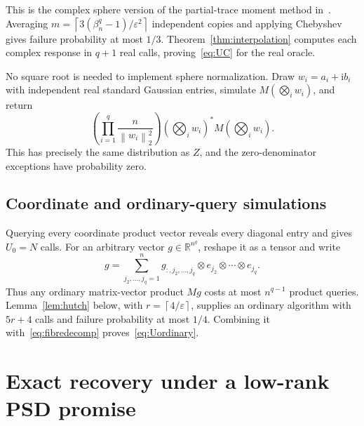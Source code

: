 \documentclass[11pt]{article}
\theoremstyle{definition}\newtheorem{definition}[theorem]{Definition}
\theoremstyle{remark}\newtheorem{remark}[theorem]{Remark}
\newcommand{\R}{\mathbb R}\newcommand{\C}{\mathbb C}
\newcommand{\eps}{\varepsilon}\newcommand{\Qprod}{Q_{\mathrm{prod}}}
\newcommand{\norm}[1]{\left\lVert#1\right\rVert}
\newcommand{\ceil}[1]{\left\lceil#1\right\rceil}
\begin{document}
This is the complex sphere version of the partial-trace moment method
in~\cite{ma}. Averaging
$m=\ceil{3(\beta_n^q-1)/\eps^2}$ independent copies and applying Chebyshev gives
failure probability at most $1/3$. Theorem~\ref{thm:interpolation} computes each
complex response in $q+1$ real calls, proving~\eqref{eq:UC} for the real oracle.

No square root is needed to implement sphere normalization. Draw
$w_i=a_i+\mathrm{i}b_i$ with independent real standard Gaussian entries,
simulate $M(\bigotimes_i w_i)$, and return
\[
 \left(\prod_{i=1}^q\frac n{\norm{w_i}_2^2}\right)
       (\bigotimes_i w_i)^*M(\bigotimes_i w_i).
\]
This has precisely the same distribution as $Z$, and the zero-denominator
exceptions have probability zero.

\subsection{Coordinate and ordinary-query simulations}
Querying every coordinate product vector reveals every diagonal entry and gives
$U_0=N$ calls. For an arbitrary vector $g\in\R^{n^q}$, reshape it as a tensor and
write
\begin{equation}\label{eq:fibredecomp}
 g=\sum_{j_2,\ldots,j_q=1}^n
      g_{:,j_2,\ldots,j_q}\otimes e_{j_2}\otimes\cdots\otimes e_{j_q}.
\end{equation}
Thus any ordinary matrix-vector product $Mg$ costs at most $n^{q-1}$ product
queries. Lemma~\ref{lem:hutch} below, with $r=\ceil{4/\eps}$, supplies an ordinary
algorithm with $5r+4$ calls and failure probability at most $1/4$.
Combining it with~\eqref{eq:fibredecomp} proves~\eqref{eq:Uordinary}.

\section{Exact recovery under a low-rank PSD promise}
\label{sec:lowrank}
\end{document}
